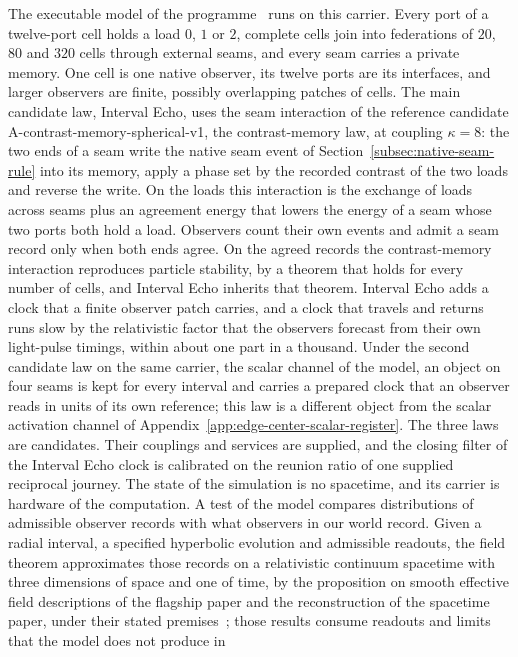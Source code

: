 \documentclass[11pt]{article}
\theoremstyle{remark}
\theoremstyle{plain}
\begin{document}
The executable model of the programme~\cite{ophmodel} runs on this carrier.
Every port of a twelve-port cell holds a load $0$, $1$ or $2$, complete
cells join into federations of $20$, $80$ and $320$ cells through external
seams, and every seam carries a private memory. One cell is one native
observer, its twelve ports are its interfaces, and larger observers are
finite, possibly overlapping patches of cells. The main candidate law,
Interval Echo, uses the seam interaction of the reference candidate
A-contrast-memory-spherical-v1, the contrast-memory law, at coupling
$\kappa=8$: the two ends of a seam write the native seam event of
Section~\ref{subsec:native-seam-rule} into its memory, apply a phase set by
the recorded contrast of the two loads and reverse the write. On the loads
this interaction is the exchange of loads across seams plus an agreement
energy that lowers the energy of a seam whose two ports both hold a load.
Observers count their own events and admit a seam record only when both ends
agree. On the agreed records the contrast-memory interaction reproduces
particle stability, by a theorem that holds for every number of cells, and
Interval Echo inherits that theorem. Interval Echo adds a clock that a
finite observer patch carries, and a clock that travels and returns runs
slow by the relativistic factor that the observers forecast from their own
light-pulse timings, within about one part in a thousand. Under the second candidate law on the same carrier, the
scalar channel of the model, an object on four seams is kept for every
interval and carries a prepared clock that an observer reads in units of its
own reference; this law is a different object from the scalar activation
channel of Appendix~\ref{app:edge-center-scalar-register}. The three laws
are candidates. Their couplings and services are supplied, and the closing
filter of the Interval Echo clock is calibrated on the reunion ratio of one
supplied reciprocal journey. The state of the simulation is no
spacetime, and its carrier is hardware of the computation. A test of the
model compares distributions of admissible observer records with what
observers in our world record. Given a radial interval, a specified hyperbolic evolution and admissible readouts, the field theorem approximates those records on a relativistic continuum spacetime with three
dimensions of space and one of time, by the proposition on smooth effective
field descriptions of the flagship paper and the reconstruction of the
spacetime paper, under their stated premises~\cite{ophsynthesis,ophEinstein};
those results consume readouts and limits that the model does not produce in
\end{document}
